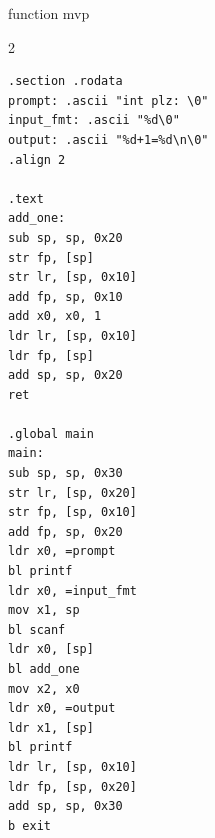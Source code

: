 \begin{frame}[fragile]{function mvp}
	\begin{multicols}{2}
		{\small
			\begin{verbatim}
.section .rodata
prompt: .ascii "int plz: \0"
input_fmt: .ascii "%d\0"
output: .ascii "%d+1=%d\n\0"
.align 2

.text
add_one:
sub sp, sp, 0x20
str fp, [sp]
str lr, [sp, 0x10]
add fp, sp, 0x10
add x0, x0, 1
ldr lr, [sp, 0x10]
ldr fp, [sp]
add sp, sp, 0x20
ret

.global main
main: 
sub sp, sp, 0x30
str lr, [sp, 0x20]
str fp, [sp, 0x10]
add fp, sp, 0x20
ldr x0, =prompt
bl printf
ldr x0, =input_fmt
mov x1, sp
bl scanf
ldr x0, [sp]
bl add_one
mov x2, x0
ldr x0, =output
ldr x1, [sp]
bl printf
ldr lr, [sp, 0x10]
ldr fp, [sp, 0x20]
add sp, sp, 0x30
b exit
\end{verbatim}
		}
	\end{multicols}
\end{frame}







